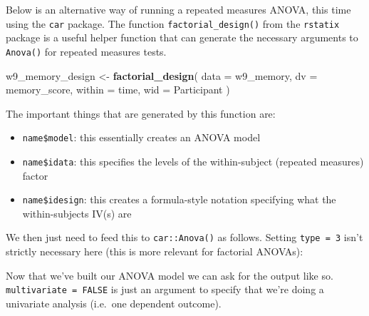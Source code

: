 \documentclass[
]{book}
\newenvironment{Shaded}{\begin{snugshade}}{\end{snugshade}}
\newcommand{\AttributeTok}[1]{\textcolor[rgb]{0.13,0.29,0.53}{#1}}
\newcommand{\DecValTok}[1]{\textcolor[rgb]{0.00,0.00,0.81}{#1}}
\newcommand{\FunctionTok}[1]{\textcolor[rgb]{0.13,0.29,0.53}{\textbf{#1}}}
\newcommand{\NormalTok}[1]{#1}
\newcommand{\OtherTok}[1]{\textcolor[rgb]{0.56,0.35,0.01}{#1}}
\newcommand{\SpecialCharTok}[1]{\textcolor[rgb]{0.81,0.36,0.00}{\textbf{#1}}}
\begin{document}
Below is an alternative way of running a repeated measures ANOVA, this time using the \texttt{car} package. The function \texttt{factorial\_design()} from the \texttt{rstatix} package is a useful helper function that can generate the necessary arguments to \texttt{Anova()} for repeated measures tests.

\begin{Shaded}
\begin{Highlighting}[]
\NormalTok{w9\_memory\_design }\OtherTok{\textless{}{-}} \FunctionTok{factorial\_design}\NormalTok{(}
  \AttributeTok{data =}\NormalTok{ w9\_memory,}
  \AttributeTok{dv =}\NormalTok{ memory\_score,}
  \AttributeTok{within =}\NormalTok{ time,}
  \AttributeTok{wid =}\NormalTok{ Participant}
\NormalTok{)}
\end{Highlighting}
\end{Shaded}

The important things that are generated by this function are:

\begin{itemize}
\item
  \texttt{name\$model}: this essentially creates an ANOVA model
\item
  \texttt{name\$idata}: this specifies the levels of the within-subject
  (repeated measures) factor
\item
  \texttt{name\$idesign}: this creates a formula-style notation specifying
  what the within-subjects IV(s) are
\end{itemize}

We then just need to feed this to \texttt{car::Anova()} as follows. Setting \texttt{type\ =\ 3} isn't strictly necessary here (this is more relevant for factorial ANOVAs):

\begin{Shaded}
\end{Shaded}

Now that we've built our ANOVA model we can ask for the output like so. \texttt{multivariate\ =\ FALSE} is just an argument to specify that we're doing a univariate analysis (i.e.~one dependent outcome).
\end{document}
